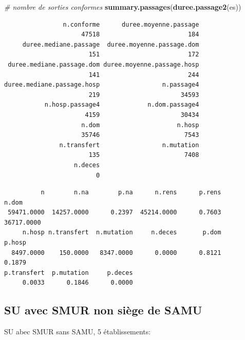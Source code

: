 \documentclass[]{article}
\newenvironment{Shaded}{\begin{snugshade}}{\end{snugshade}}
\newcommand{\KeywordTok}[1]{\textcolor[rgb]{0.13,0.29,0.53}{\textbf{{#1}}}}
\newcommand{\CommentTok}[1]{\textcolor[rgb]{0.56,0.35,0.01}{\textit{{#1}}}}
\newcommand{\NormalTok}[1]{{#1}}
\begin{document}
\begin{Shaded}
\begin{Highlighting}[]
    \CommentTok{# nombre de sorties conformes}
    \KeywordTok{summary.passages}\NormalTok{(}\KeywordTok{duree.passage2}\NormalTok{(es))}
\end{Highlighting}
\end{Shaded}

\begin{verbatim}
                n.conforme      duree.moyenne.passage 
                     47518                        184 
     duree.mediane.passage  duree.moyenne.passage.dom 
                       151                        172 
 duree.mediane.passage.dom duree.moyenne.passage.hosp 
                       141                        244 
duree.mediane.passage.hosp                 n.passage4 
                       219                      34593 
           n.hosp.passage4             n.dom.passage4 
                      4159                      30434 
                     n.dom                     n.hosp 
                     35746                       7543 
               n.transfert                 n.mutation 
                       135                       7408 
                   n.deces 
                         0 
\end{verbatim}

\begin{Shaded}
\end{Shaded}

\begin{verbatim}
          n        n.na        p.na      n.rens      p.rens       n.dom 
 59471.0000  14257.0000      0.2397  45214.0000      0.7603  36717.0000 
     n.hosp n.transfert  n.mutation     n.deces       p.dom      p.hosp 
  8497.0000    150.0000   8347.0000      0.0000      0.8121      0.1879 
p.transfert  p.mutation     p.deces 
     0.0033      0.1846      0.0000 
\end{verbatim}

\subsection{SU avec SMUR non siège de
SAMU}\label{su-avec-smur-non-siege-de-samu}

SU abec SMUR sans SAMU, 5 établissements:
\end{document}

